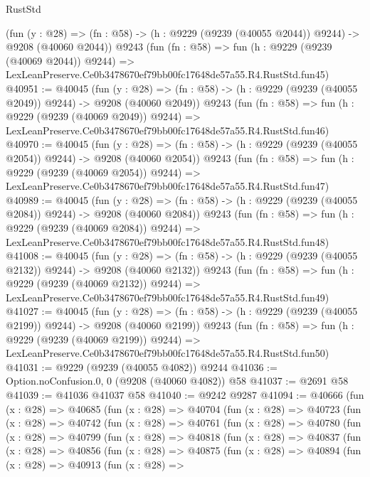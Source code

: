 \begin{lexlean}{RustStd}
\begin{coremodule}
    (fun (y : @28) =>
    (fn : @58) -> (h : @9229 (@9239 (@40055 @2044)) @9244) -> @9208 (@40060 @2044))
    @9243
    (fun (fn : @58) =>
    fun (h : @9229 (@9239 (@40069 @2044)) @9244) =>
    LexLeanPreserve.Ce0b3478670ef79bb00fc17648de57a55.R4.RustStd.fun45)
@40951 := @40045
    (fun (y : @28) =>
    (fn : @58) -> (h : @9229 (@9239 (@40055 @2049)) @9244) -> @9208 (@40060 @2049))
    @9243
    (fun (fn : @58) =>
    fun (h : @9229 (@9239 (@40069 @2049)) @9244) =>
    LexLeanPreserve.Ce0b3478670ef79bb00fc17648de57a55.R4.RustStd.fun46)
@40970 := @40045
    (fun (y : @28) =>
    (fn : @58) -> (h : @9229 (@9239 (@40055 @2054)) @9244) -> @9208 (@40060 @2054))
    @9243
    (fun (fn : @58) =>
    fun (h : @9229 (@9239 (@40069 @2054)) @9244) =>
    LexLeanPreserve.Ce0b3478670ef79bb00fc17648de57a55.R4.RustStd.fun47)
@40989 := @40045
    (fun (y : @28) =>
    (fn : @58) -> (h : @9229 (@9239 (@40055 @2084)) @9244) -> @9208 (@40060 @2084))
    @9243
    (fun (fn : @58) =>
    fun (h : @9229 (@9239 (@40069 @2084)) @9244) =>
    LexLeanPreserve.Ce0b3478670ef79bb00fc17648de57a55.R4.RustStd.fun48)
@41008 := @40045
    (fun (y : @28) =>
    (fn : @58) -> (h : @9229 (@9239 (@40055 @2132)) @9244) -> @9208 (@40060 @2132))
    @9243
    (fun (fn : @58) =>
    fun (h : @9229 (@9239 (@40069 @2132)) @9244) =>
    LexLeanPreserve.Ce0b3478670ef79bb00fc17648de57a55.R4.RustStd.fun49)
@41027 := @40045
    (fun (y : @28) =>
    (fn : @58) -> (h : @9229 (@9239 (@40055 @2199)) @9244) -> @9208 (@40060 @2199))
    @9243
    (fun (fn : @58) =>
    fun (h : @9229 (@9239 (@40069 @2199)) @9244) =>
    LexLeanPreserve.Ce0b3478670ef79bb00fc17648de57a55.R4.RustStd.fun50)
@41031 := @9229 (@9239 (@40055 @4082)) @9244
@41036 := Option.noConfusion.{0, 0} (@9208 (@40060 @4082)) @58
@41037 := @2691 @58
@41039 := @41036 @41037 @58
@41040 := @9242 @9287
@41094 := @40666
    (fun (x : @28) =>
    @40685
      (fun (x : @28) =>
      @40704
        (fun (x : @28) =>
        @40723
          (fun (x : @28) =>
          @40742
            (fun (x : @28) =>
            @40761
              (fun (x : @28) =>
              @40780
                (fun (x : @28) =>
                @40799
                  (fun (x : @28) =>
                  @40818
                    (fun (x : @28) =>
                    @40837
                      (fun (x : @28) =>
                      @40856
                        (fun (x : @28) =>
                        @40875
                          (fun (x : @28) =>
                          @40894
                            (fun (x : @28) =>
                            @40913
                              (fun (x : @28) =>

\end{coremodule}
\end{lexlean}

